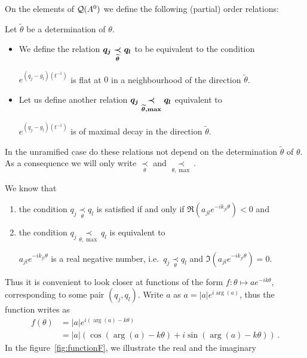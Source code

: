 On the elements of $\cQ(A^0)$ we define the following (partial) order
relations:
\begin{defn}\label{defn:definingRelations}
  Let $\tilde\theta$ be a determination of $\theta$.
  \begin{itemize}
    \item We define the relation
      $\boldmath q_j \underset{\tilde\theta}{\prec} q_l$ to be equivalent to
      the condition
      \begin{einr}
        $e^{(q_j-g_l)(t^{-1})}$ is flat at $0$ in a neighbourhood of the
        direction $\tilde\theta$.
      \end{einr}
    \item Let us define another relation
      $\boldmath q_j \underset{\tilde\theta,\max}{\prec} q_l$ equivalent to
      \begin{einr}
        $e^{(q_j-g_l)(t^{-1})}$ is of maximal decay in the direction
        $\tilde\theta$.
      \end{einr}
  \end{itemize}
  \begin{s-rem}
    In the unramified case do these relations not depend on the determination
    $\tilde\theta$ of $\theta$. As a consequence we will only write
    $\underset{\theta}{\prec}$ and $\underset{\theta,\max}{\prec}$.
  \end{s-rem}
\end{defn}
We know that
\begin{enumerate}
  \item the condition $q_j \underset{\theta}{\prec} q_l$ is
    satisfied if and only if $\Re(a_{jl}e^{-ik_{jl}\theta})<0$ and
  \item the condition $q_j \underset{\theta,\max}{\prec} q_l$ is
    equivalent to
    \begin{einr}
      $a_{jl}e^{-ik_{jl}\theta}$ is a real negative
      number, i.e.\ $q_j \underset{\theta}{\prec} q_l$ and
      $\Im(a_{jl}e^{-ik_{jl}\theta})=0$.
    \end{einr}
\end{enumerate}
Thus it is convenient to look closer at functions of the form
$f:\theta\mapsto ae^{-ik\theta}$, corresponding to some pair $(q_j,q_l)$.
Write $a$ as $a=|a|e^{i\arg(a)}$, thus the function writes as
\begin{align*}
  f(\theta)&=|a|e^{i(\arg(a)-k\theta)}
  \\&=|a|(\cos(\arg(a)-k\theta) + i\sin(\arg(a)-k\theta)) \,.
\end{align*}
In the figure~\ref{fig:functionF}, we illustrate the real and the imaginary

